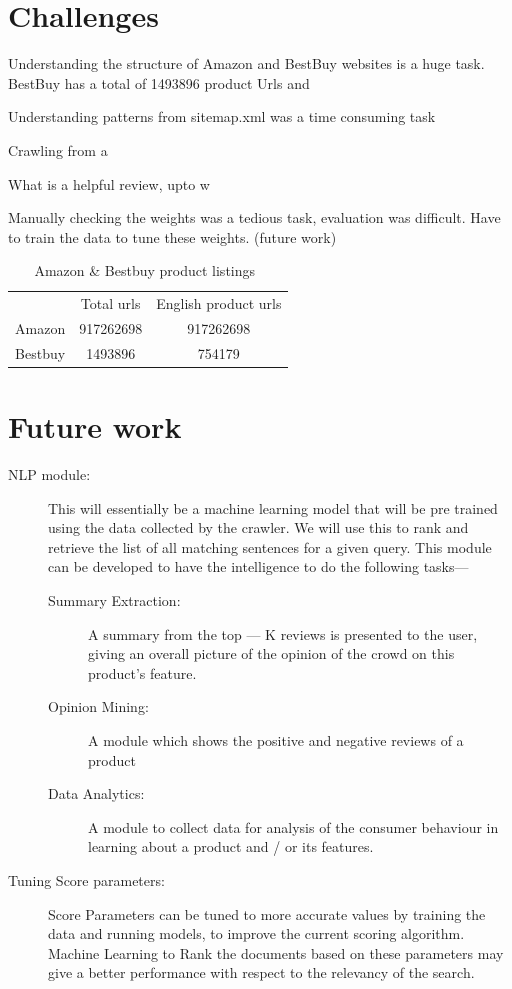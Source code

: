 \documentclass{article}
\begin{document}
\section{Challenges}
\begin{description}
  \item Understanding the structure of Amazon and BestBuy websites is a huge task. BestBuy has a total of 1493896 product Urls and 
  \item Understanding patterns from sitemap.xml was a time consuming task
  \item Crawling from a 
  \item What is a helpful review, upto w
  \item Manually checking the weights was a tedious task, evaluation was difficult.  Have to train the data to tune these weights. (future work)
\end{description}

\begin{table}
  \centering
  \begin{tabular}{c c c} 
    & Total urls & English product urls \\
    Amazon & 917262698 & 917262698\\
    Bestbuy & 1493896 & 754179\\
  \end{tabular}
  \caption{Amazon \& Bestbuy product listings~\label{tab:bestbuy}}
\end{table}

\section{Future work}
\begin{description}
  \item[NLP module:] This will essentially be a machine learning model that will be pre trained using the data collected by the crawler. We will use this to rank and retrieve the list of all matching sentences for a given query. This module can be developed to have the intelligence to do the following tasks---
	\begin{description}
		\item[Summary Extraction: ] A summary from the top --- K reviews is presented to the user, giving an overall picture of the opinion of the crowd on this product's feature. 
		\item[Opinion Mining:] A module which shows the positive and negative reviews of a product
		\item[Data Analytics:] A module to collect data for analysis of the consumer behaviour in learning about a product and / or its features.
	\end{description}
 \item[Tuning Score parameters: ] Score Parameters can be tuned to more accurate values by training the data and running models, to improve the current scoring algorithm. Machine Learning to Rank the documents based on these parameters  may give a better performance with respect to the relevancy of the search.

\end{description}



\end{document}
